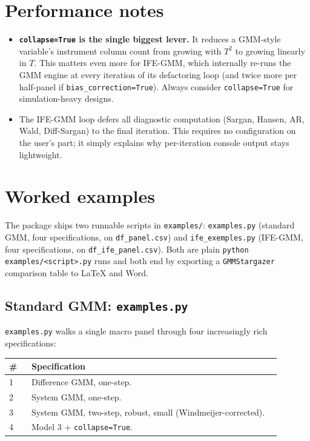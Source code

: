 \documentclass[11pt,a4paper]{article}
\begin{document}
\section{Performance notes}
\label{sec:performance}

\begin{itemize}[nosep]
  \item \textbf{\texttt{collapse=True} is the single biggest lever.} It
    reduces a GMM-style variable's instrument column count from growing
    with $T^2$ to growing linearly in $T$. This matters even more for
    IFE-GMM, which internally re-runs the GMM engine at every iteration of
    its defactoring loop (and twice more per half-panel if
    \texttt{bias\_correction=True}). Always consider \texttt{collapse=True}
    for simulation-heavy designs.
  \item The IFE-GMM loop defers all diagnostic computation (Sargan, Hansen,
    AR, Wald, Diff-Sargan) to the final iteration. This requires no
    configuration on the user's part; it simply explains why per-iteration
    console output stays lightweight.
\end{itemize}

\section{Worked examples}
\label{sec:examples}

The package ships two runnable scripts in \texttt{examples/}:
\texttt{examples.py} (standard GMM, four specifications, on
\texttt{df\_panel.csv}) and \texttt{ife\_exemples.py} (IFE-GMM, four
specifications, on \texttt{df\_ife\_panel.csv}). Both are plain
\texttt{python examples/<script>.py} runs and both end by exporting a
\texttt{GMMStargazer} comparison table to \LaTeX{} and Word.

\subsection{Standard GMM: \texttt{examples.py}}

\texttt{examples.py} walks a single macro panel through four increasingly
rich specifications:

\newpage
\begin{longtable}{@{}p{0.08\linewidth}p{0.89\linewidth}@{}}
\toprule
\textbf{\#} & \textbf{Specification} \\
\midrule
\endhead
1 & Difference GMM, one-step. \\
2 & System GMM, one-step. \\
3 & System GMM, two-step, robust, small (Windmeijer-corrected). \\
4 & Model 3 + \texttt{collapse=True}. \\
\bottomrule
\end{longtable}
\end{document}
